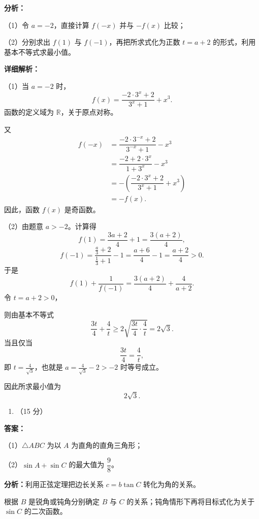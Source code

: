 \documentclass[UTF8,12pt,a4paper]{ctexart}
\renewcommand{\labelenumi}{\arabic{enumi}.}
\providecommand{\tightlist}{%
  \setlength{\itemsep}{0pt}\setlength{\parskip}{0pt}}
\begin{document}
\textbf{分析：}
\par\smallskip\noindent（1）令 \(a=-2\)，直接计算 \(f(-x)\) 并与 \(-f(x)\) 比较；
\par\smallskip\noindent（2）分别求出 \(f(1)\) 与 \(f(-1)\)，再把所求式化为正数 \(t=a+2\) 的形式，利用基本不等式求最小值。

\textbf{详细解析：}


\par\smallskip\noindent（1）当 \(a=-2\) 时，
\[
   f(x)=\dfrac{-2\cdot 3^x+2}{3^x+1}+x^3.
   \]
函数的定义域为 \(\mathbb R\)，关于原点对称。

又
\[
   \begin{aligned}
   f(-x)
   &=\dfrac{-2\cdot 3^{-x}+2}{3^{-x}+1}-x^3\\
   &=\dfrac{-2+2\cdot 3^x}{1+3^x}-x^3\\
   &=-\left(\dfrac{-2\cdot 3^x+2}{3^x+1}+x^3\right)\\
   &=-f(x).
   \end{aligned}
   \]
因此，函数 \(f(x)\) 是奇函数。


\par\smallskip\noindent（2）由题意 \(a>-2\)。计算得
\[
   f(1)=\dfrac{3a+2}{4}+1=\dfrac{3(a+2)}4,
   \]
\[
   f(-1)=\dfrac{\frac a3+2}{\frac13+1}-1
   =\dfrac{a+6}{4}-1
   =\dfrac{a+2}{4}>0.
   \]
于是
\[
   f(1)+\frac1{f(-1)}
   =\dfrac{3(a+2)}4+\frac4{a+2}.
   \]
令 \(t=a+2>0\)，

则由基本不等式
\[
   \dfrac{3t}{4}+\frac4t
   \geqslant 2\sqrt{\dfrac{3t}{4}\cdot\frac4t}
   =2\sqrt3.
   \]
当且仅当
\[
   \dfrac{3t}{4}=\frac4t,
   \]
即 \(t=\frac4{\sqrt3}\)，也就是 \(a=\frac4{\sqrt3}-2>-2\) 时等号成立。

因此所求最小值为
\[
   \boxed{2\sqrt3}.
   \]

\begin{enumerate}
\def\labelenumi{\arabic{enumi}.}
\setcounter{enumi}{16}
\tightlist
\item
  （15 分）
\end{enumerate}

\textbf{答案：}
\par\smallskip\noindent（1）\(\triangle ABC\) 为以 \(A\) 为直角的直角三角形；
\par\smallskip\noindent（2）\(\sin A+\sin C\) 的最大值为 \(\dfrac98\)。

\textbf{分析：}利用正弦定理把边长关系 \(c=b\tan C\) 转化为角的关系。

根据 \(B\) 是锐角或钝角分别确定 \(B\) 与 \(C\) 的关系；钝角情形下再将目标式化为关于 \(\sin C\) 的二次函数。
\end{document}
